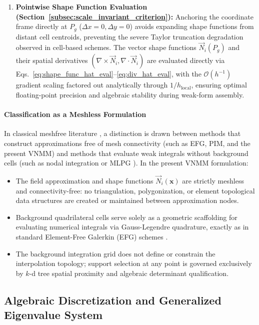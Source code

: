 \documentclass[preprint,12pt]{elsarticle}
\begin{document}
\begin{enumerate}
    \item \textbf{Pointwise Shape Function Evaluation (Section~\ref{subsec:scale_invariant_criterion}):} Anchoring the coordinate frame directly at $P_g$ ($\Delta x = 0, \Delta y = 0$) avoids expanding shape functions from distant cell centroids, preventing the severe Taylor truncation degradation observed in cell-based schemes. The vector shape functions $\vec{N}_i(P_g)$ and their spatial derivatives $(\nabla \times \vec{N}_i, \nabla \cdot \vec{N}_i)$ are evaluated directly via Eqs.~\eqref{eq:shape_func_hat_eval}--\eqref{eq:div_hat_eval}, with the $\mathcal{O}(h^{-1})$ gradient scaling factored out analytically through $1/h_{\mathrm{local}}$, ensuring optimal floating-point precision and algebraic stability during weak-form assembly.
\end{enumerate}

\paragraph{Classification as a Meshless Formulation}
In classical meshfree literature \cite{belytschko1994element, atluri2002meshless, liu2009mesh}, a distinction is drawn between methods that construct approximations free of mesh connectivity (such as EFG, PIM, and the present VNMM) and methods that evaluate weak integrals without background cells (such as nodal integration \cite{chen2001stabilized} or MLPG \cite{atluri2002meshless}). In the present VNMM formulation:
\begin{itemize}
    \item The field approximation and shape functions $\vec{N}_i(\mathbf{x})$ are strictly meshless and connectivity-free: no triangulation, polygonization, or element topological data structures are created or maintained between approximation nodes.
    \item Background quadrilateral cells serve solely as a geometric scaffolding for evaluating numerical integrals via Gauss-Legendre quadrature, exactly as in standard Element-Free Galerkin (EFG) schemes \cite{belytschko1994element, parreira2006efficient}.
    \item The background integration grid does not define or constrain the interpolation topology; support selection at any point is governed exclusively by $k$-d tree spatial proximity and algebraic determinant qualification.
\end{itemize}

\subsection{Algebraic Discretization and Generalized Eigenvalue System}
\label{subsec:algebraic_system}
\end{document}
